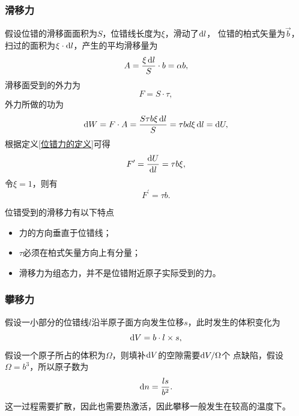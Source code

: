                 \subsubsection{滑移力}
                    假设位错的滑移面面积为$S$，位错线长度为$\xi$，滑动了$\mathop{}\!\mathrm{d} l$，
                    位错的柏式矢量为$\vec{b}$，扫过的面积为$\xi\cdot\mathop{}\!\mathrm{d} l$，产生的平均滑移量为
                    \begin{equation}
                        A=\frac{\xi\mathop{}\!\mathrm{d} l}{S}\cdot b=\alpha b,
                    \end{equation}
                    滑移面受到的外力为
                    \begin{equation}
                        F=S\cdot\tau,
                    \end{equation}
                    外力所做的功为
                    \begin{equation}
                        \mathop{}\!\mathrm{d} W=F\cdot A=\frac{S\tau b\xi\mathop{}\!\mathrm{d} l}{S}=\tau bd\xi\mathop{}\!\mathrm{d} l=\mathop{}\!\mathrm{d} U,
                    \end{equation}
                    根据定义\autoref{位错力的定义}可得
                    \begin{equation}
                        F^{\prime}=\frac{\mathop{}\!\mathrm{d} U}{\mathop{}\!\mathrm{d} l}=\tau b\xi,
                    \end{equation}
                    令$\xi=1$，则有
                    \begin{equation}
                        F^{\prime}=\tau b.
                    \end{equation}

                    位错受到的滑移力有以下特点
                    \begin{itemize}
                        \item 力的方向垂直于位错线；
                        \item $\tau$必须在柏式矢量方向上有分量；
                        \item 滑移力为组态力，并不是位错附近原子实际受到的力。
                    \end{itemize}
                \subsubsection{攀移力}
                    假设一小部分的位错线$l$沿半原子面方向发生位移$s$，此时发生的体积变化为
                    \begin{equation}
                        \mathop{}\!\mathrm{d} V=b\cdot l\times s,
                    \end{equation}
                    假设一个原子所占的体积为$\Omega$，则填补$\mathop{}\!\mathrm{d} V$的空隙需要$\mathop{}\!\mathrm{d} V/\Omega$个
                    点缺陷，假设$\Omega=b^3$，所以原子数为
                    \begin{equation}
                        \mathop{}\!\mathrm{d} n=\frac{ls}{b^2}.
                    \end{equation}
                    这一过程需要扩散，因此也需要热激活，因此攀移一般发生在较高的温度下。

